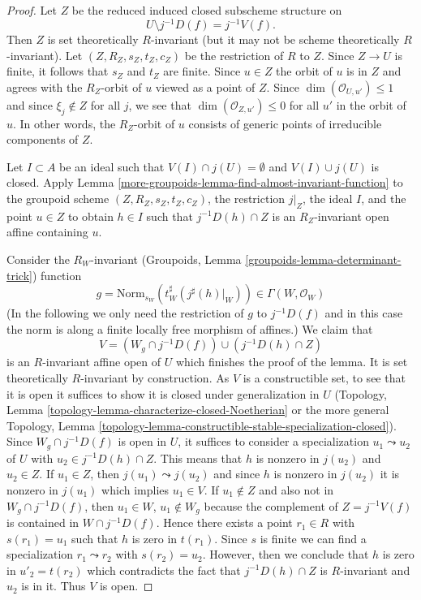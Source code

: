 \begin{proof}
\medskip\noindent
Let $Z$ be the reduced induced closed subscheme structure on
$$
U \setminus j^{-1}D(f) = j^{-1}V(f).
$$
Then $Z$ is set theoretically
$R$-invariant (but it may not be scheme theoretically $R$-invariant).
Let $(Z, R_Z, s_Z, t_Z, c_Z)$ be the restriction of $R$ to $Z$.
Since $Z \to U$ is finite, it follows that $s_Z$ and $t_Z$ are finite.
Since $u \in Z$ the orbit of $u$ is in $Z$ and agrees with the
$R_Z$-orbit of $u$ viewed as a point of $Z$. Since
$\dim(\mathcal{O}_{U, u'}) \leq 1$ and since $\xi_j \not \in Z$
for all $j$, we see that $\dim(\mathcal{O}_{Z, u'}) \leq 0$ for
all $u'$ in the orbit of $u$. In other words, the $R_Z$-orbit of $u$
consists of generic points of irreducible components of $Z$.

\medskip\noindent
Let $I \subset A$ be an ideal such that $V(I) \cap j(U) =\emptyset$
and $V(I) \cup j(U)$ is closed. Apply
Lemma \ref{more-groupoids-lemma-find-almost-invariant-function} to
the groupoid scheme $(Z, R_Z, s_Z, t_Z, c_Z)$, the restriction $j|_Z$,
the ideal $I$, and the point $u \in Z$ to obtain $h \in I$ such that
$j^{-1}D(h) \cap Z$ is an $R_Z$-invariant open affine containing $u$.

\medskip\noindent
Consider the $R_W$-invariant (Groupoids, Lemma
\ref{groupoids-lemma-determinant-trick}) function
$$
g =
\text{Norm}_{s_W}(t_W^\sharp(j^\sharp(h)|_W)) \in \Gamma(W, \mathcal{O}_W)
$$
(In the following we only need the restriction of $g$ to $j^{-1}D(f)$ and
in this case the norm is along a finite locally free morphism of affines.)
We claim that
$$
V = (W_g \cap j^{-1}D(f)) \cup (j^{-1}D(h) \cap Z)
$$
is an $R$-invariant affine open of $U$ which finishes the proof of the lemma.
It is set theoretically $R$-invariant by construction. As $V$ is a
constructible set, to see that it is open it suffices to show it is
closed under generalization in $U$ (Topology, Lemma
\ref{topology-lemma-characterize-closed-Noetherian}
or the more general
Topology, Lemma
\ref{topology-lemma-constructible-stable-specialization-closed}).
Since $W_g \cap j^{-1}D(f)$ is open in $U$, it suffices to consider
a specialization $u_1 \leadsto u_2$ of $U$ with
$u_2 \in j^{-1}D(h) \cap Z$.
This means that $h$ is nonzero in $j(u_2)$ and $u_2 \in Z$.
If $u_1 \in Z$, then $j(u_1) \leadsto j(u_2)$ and since
$h$ is nonzero in $j(u_2)$ it is nonzero in $j(u_1)$ which
implies $u_1 \in V$. If $u_1 \not \in Z$ and
also not in $W_g \cap j^{-1}D(f)$, then $u_1 \in W$, $u_1 \not \in W_g$
because the complement of $Z = j^{-1}V(f)$ is contained in $W \cap j^{-1}D(f)$.
Hence there exists a point $r_1 \in R$ with $s(r_1) = u_1$
such that $h$ is zero in $t(r_1)$. Since $s$ is finite we
can find a specialization $r_1 \leadsto r_2$ with $s(r_2) = u_2$.
However, then we conclude that $h$ is zero in $u'_2 = t(r_2)$
which contradicts the fact that $j^{-1}D(h) \cap Z$
is $R$-invariant and $u_2$ is in it. Thus $V$ is open.


\end{proof}
